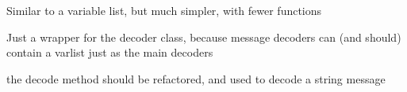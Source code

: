 \documentclass[letterpaper,10pt,english]{sphinxmanual}
\begin{document}

\begin{fulllineitems}
\label{classes:pyodec.core.FixedVariableList}
Similar to a variable list, but much simpler, with fewer functions

\end{fulllineitems}


\begin{fulllineitems}
\label{classes:pyodec.core.MessageDecoder}
Just a wrapper for the decoder class, because message decoders can (and should)
contain a varlist just as the main decoders

\begin{fulllineitems}
\label{classes:pyodec.core.MessageDecoder.decode}
the decode method should be refactored, and used to decode a string message

\end{fulllineitems}


\end{fulllineitems}

\end{document}
